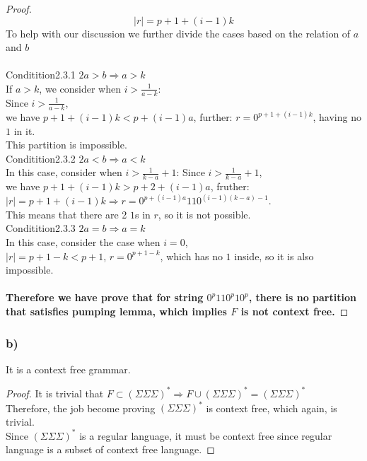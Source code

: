 \documentclass{article}
\begin{document}
\begin{proof}
				$$|r| = p+1+(i-1)k$$
				To help with our discussion we further divide the cases based on the relation of $a$ and $b$\\
			\\
			Conditition2.3.1 $2a > b \Rightarrow a > k$ \\
				If $a>k$, we consider when $i > \frac{1}{a-k}$: \\
				Since $i > \frac{1}{a-k}$, \\
				we have $p+1+(i-1)k < p+(i-1)a$, further:
				$r = 0^{p+1+(i-1)k}$, having no $1$ in it. \\
				This partition is impossible. 
			\\
			Conditition2.3.2 $2a < b \Rightarrow a < k$ \\
				In this case, consider when $i > \frac{1}{k-a} + 1$:
				Since $i > \frac{1}{k-a} + 1$, \\
				we have $p+1+(i-1)k > p+2+(i-1)a$, fruther: 
				$|r| = p+1+(i-1)k \Rightarrow r = 0^{p+(i-1)a}110^{(i-1)(k-a)-1}$.\\
				This means that there are 2 $1$s in $r$, so it is not possible. \\
			Conditition2.3.3 $2a = b \Rightarrow a = k$ \\
				In this case, consider the case when $i = 0$, \\
				$|r| = p+1-k < p + 1$, $r = 0^{p+1-k}$, which has no $1$ inside, so it is also impossible.
		\\ \\
		\textbf{Therefore we have prove that for string $0^{p}110^{p}10^{p}$, there is no partition that satisfies pumping lemma, which implies $F$ is not context free.}

	\end{proof}

\subsubsection{b)}
	It is a context free grammar.
	\begin{proof}
		It is trivial that $F \subset (\Sigma\Sigma\Sigma)^* \Rightarrow F \cup (\Sigma \Sigma \Sigma)^* = (\Sigma \Sigma \Sigma)^*$ \\
		Therefore, the job become proving $(\Sigma \Sigma \Sigma)^*$ is context free, which again, is trivial.\\
		Since $(\Sigma \Sigma \Sigma)^*$ is a regular language, it must be context free since regular language is a subset of context free language.
	\end{proof}
\end{document}
